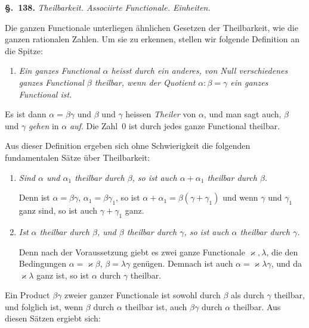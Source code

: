 \documentclass[12pt,a4paper]{article}
\theoremstyle{definition}
\begin{document}
\noindent\textbf{\S.~138.}\quad
\textit{Theilbarkeit. Associirte Functionale. Einheiten.}\par\medskip

Die ganzen Functionale unterliegen ähnlichen Gesetzen der Theilbarkeit, wie die ganzen rationalen Zahlen. Um sie zu erkennen, stellen wir folgende Definition an die Spitze:

\begin{enumerate}[label=\arabic*.]
\item \textit{Ein ganzes Functional $\alpha$ heisst durch ein anderes, von Null verschiedenes ganzes Functional $\beta$ \emph{theilbar}, wenn der Quotient $\alpha:\beta=\gamma$ ein ganzes Functional ist.}
\end{enumerate}

Es ist dann $\alpha=\beta\gamma$ und $\beta$ und $\gamma$ heissen \emph{Theiler} von $\alpha$, und man sagt auch, $\beta$ und $\gamma$ \emph{gehen} in $\alpha$ \emph{auf}. Die Zahl~$0$ ist durch jedes ganze Functional theilbar.

Aus dieser Definition ergeben sich ohne Schwierigkeit die folgenden fundamentalen Sätze über Theilbarkeit:

\begin{enumerate}[label=\arabic*., resume]
\item \textit{Sind $\alpha$ und $\alpha_1$ theilbar durch $\beta$, so ist auch $\alpha+\alpha_1$ theilbar durch $\beta$.}

Denn ist $\alpha=\beta\gamma$, $\alpha_1=\beta\gamma_1$, so ist $\alpha+\alpha_1=\beta(\gamma+\gamma_1)$ und wenn $\gamma$ und $\gamma_1$ ganz sind, so ist auch $\gamma+\gamma_1$ ganz.

\item \textit{Ist $\alpha$ theilbar durch $\beta$, und $\beta$ theilbar durch $\gamma$, so ist auch $\alpha$ theilbar durch $\gamma$.}

Denn nach der Voraussetzung giebt es zwei ganze Functionale $\varkappa,\lambda$, die den Bedingungen $\alpha=\varkappa\beta$, $\beta=\lambda\gamma$ genügen. Demnach ist auch $\alpha=\varkappa\lambda\gamma$, und da $\varkappa\lambda$ ganz ist, so ist $\alpha$ durch $\gamma$ theilbar.
\end{enumerate}

Ein Product $\beta\gamma$ zweier ganzer Functionale ist sowohl durch $\beta$ als durch $\gamma$ theilbar, und folglich ist, wenn $\beta$ durch $\alpha$ theilbar ist, auch $\beta\gamma$ durch $\alpha$ theilbar. Aus diesen Sätzen ergiebt sich:
\end{document}
